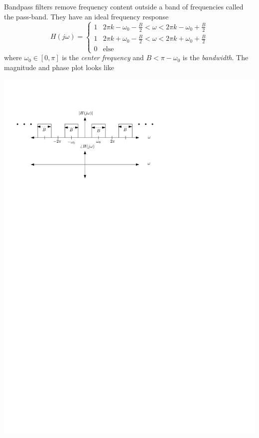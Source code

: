 Bandpass filters remove frequency content outside a band of frequencies called the pass-band. They have an ideal frequency response
\[
H(j\omega) = \left\{ \begin{array}{lc}
  1 & 2\pi k -\omega_0 - \frac{B}{2} < \omega < 2\pi k -\omega_0+\frac{B}{2}\\[1em]
  1 & 2\pi k + \omega_0 -\frac{B}{2} < \omega < 2\pi k + \omega_0+\frac{B}{2}\\[1em]
  0 & \text{else}
\end{array}
\right. 
\]
where $\omega_0\in [0,\pi]$ is the \emph{center frequency} and $B < \pi - \omega_0$ is the \emph{bandwidth}. The magnitude and phase plot looks like
\begin{center}
  \includegraphics[scale=1]{graphics/bandpass-ideal-dt.pdf}
\end{center}

